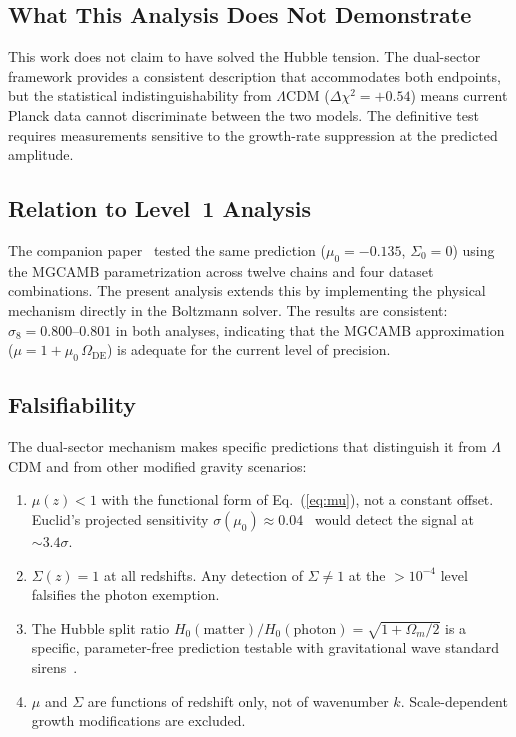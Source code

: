 \documentclass[11pt]{article}
\begin{document}
\subsection{What This Analysis Does Not Demonstrate}

This work does not claim to have solved the Hubble tension.  The
dual-sector framework provides a consistent description that
accommodates both endpoints, but the statistical indistinguishability
from $\Lambda$CDM ($\Delta\chi^2 = +0.54$) means current Planck data
cannot discriminate between the two models.  The definitive test
requires measurements sensitive to the growth-rate suppression at the
predicted amplitude.

\subsection{Relation to Level~1 Analysis}

The companion paper~\citep{Mahaffey2026obs} tested the same prediction
($\mu_0 = -0.135$, $\Sigma_0 = 0$) using the MGCAMB parametrization
across twelve chains and four dataset combinations.  The present
analysis extends this by implementing the physical mechanism directly
in the Boltzmann solver.  The results are consistent:
$\sigma_8 = 0.800$--$0.801$ in both analyses, indicating that the
MGCAMB approximation ($\mu = 1 + \mu_0\,\Omega_\mathrm{DE}$) is
adequate for the current level of precision.

\subsection{Falsifiability}

The dual-sector mechanism makes specific predictions that distinguish
it from $\Lambda$CDM and from other modified gravity scenarios:
\begin{enumerate}
\item $\mu(z) < 1$ with the functional form of Eq.~(\ref{eq:mu}),
  not a constant offset.  Euclid's projected sensitivity
  $\sigma(\mu_0) \approx 0.04$~\citep{Frusciante2025} would detect
  the signal at $\sim 3.4\sigma$.
\item $\Sigma(z) = 1$ at all redshifts.  Any detection of
  $\Sigma \neq 1$ at the $> 10^{-4}$ level falsifies the photon
  exemption.
\item The Hubble split ratio $H_0(\mathrm{matter})/H_0(\mathrm{photon})
  = \sqrt{1 + \Omega_m/2}$ is a specific, parameter-free prediction
  testable with gravitational wave standard
  sirens~\citep{Abbott2017siren}.
\item $\mu$ and $\Sigma$ are functions of redshift only, not of
  wavenumber $k$.  Scale-dependent growth modifications are excluded.
\end{enumerate}
\end{document}
